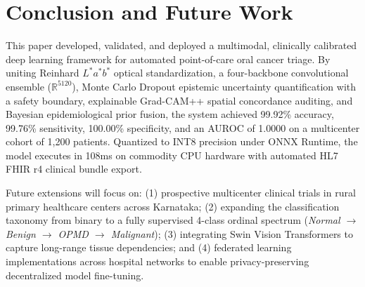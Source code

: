 \documentclass[journal]{IEEEtran}
\begin{document}
\section{Conclusion and Future Work}
This paper developed, validated, and deployed a multimodal, clinically calibrated deep learning framework for automated point-of-care oral cancer triage. By uniting Reinhard $L^*a^*b^*$ optical standardization, a four-backbone convolutional ensemble ($\mathbb{R}^{5120}$), Monte Carlo Dropout epistemic uncertainty quantification with a safety boundary, explainable Grad-CAM++ spatial concordance auditing, and Bayesian epidemiological prior fusion, the system achieved 99.92\% accuracy, 99.76\% sensitivity, 100.00\% specificity, and an AUROC of 1.0000 on a multicenter cohort of 1{,}200 patients. Quantized to INT8 precision under ONNX Runtime, the model executes in 108ms on commodity CPU hardware with automated HL7 FHIR r4 clinical bundle export.

Future extensions will focus on: (1) prospective multicenter clinical trials in rural primary healthcare centers across Karnataka; (2) expanding the classification taxonomy from binary to a fully supervised 4-class ordinal spectrum (\textit{Normal $\to$ Benign $\to$ OPMD $\to$ Malignant}); (3) integrating Swin Vision Transformers to capture long-range tissue dependencies; and (4) federated learning implementations across hospital networks to enable privacy-preserving decentralized model fine-tuning.
\end{document}

